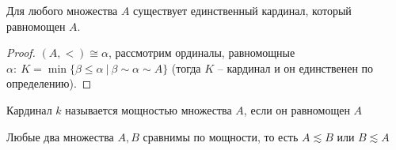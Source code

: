 \begin{lem}
Для любого множества $A$ существует единственный кардинал, который равномощен $A$.
\end{lem}
\begin{proof}
$(A, <) \cong \alpha$, рассмотрим ординалы, равномощные $\alpha:\ K = \min\{\beta \leqslant \alpha\ |\ \beta \sim \alpha \sim A\}$ (тогда $K$ -- кардинал и он единственен по определению).
\end{proof}

\begin{defn}
Кардинал $k$ называется мощностью множества $A$, если он равномощен $A$
\end{defn}

\begin{lem}
Любые два множества $A, B$ сравнимы по мощности, то есть $A \lesssim B$ или $B \lesssim A$
\end{lem}